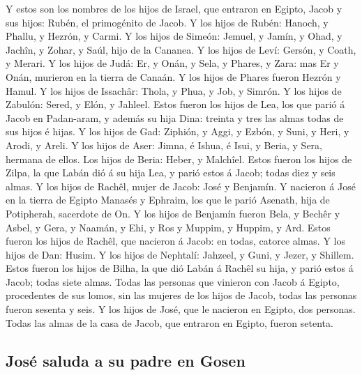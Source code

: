  Y estos son los nombres de los hijos de Israel, que
entraron en Egipto, Jacob y sus hijos: Rubén, el primogénito de Jacob.
 Y los hijos de Rubén: Hanoch, y Phallu, y Hezrón, y
Carmi.  Y los hijos de Simeón: Jemuel, y Jamín, y Ohad, y
Jachîn, y Zohar, y Saúl, hijo de la Cananea.  Y los hijos
de Leví: Gersón, y Coath, y Merari.  Y los hijos de Judá:
Er, y Onán, y Sela, y Phares, y Zara: mas Er y Onán, murieron en la
tierra de Canaán. Y los hijos de Phares fueron Hezrón y Hamul.
 Y los hijos de Issachâr: Thola, y Phua, y Job, y Simrón.
 Y los hijos de Zabulón: Sered, y Elón, y Jahleel.
 Estos fueron los hijos de Lea, los que parió á Jacob en
Padan-aram, y además su hija Dina: treinta y tres las almas todas de sus
hijos é hijas.  Y los hijos de Gad: Ziphión, y Aggi, y
Ezbón, y Suni, y Heri, y Arodi, y Areli.  Y los hijos de
Aser: Jimna, é Ishua, é Isui, y Beria, y Sera, hermana de ellos. Los
hijos de Beria: Heber, y Malchîel.  Estos fueron los
hijos de Zilpa, la que Labán dió á su hija Lea, y parió estos á Jacob;
todas diez y seis almas.  Y los hijos de Rachêl, mujer de
Jacob: José y Benjamín.  Y nacieron á José en la tierra
de Egipto Manasés y Ephraim, los que le parió Asenath, hija de
Potipherah, sacerdote de On.  Y los hijos de Benjamín
fueron Bela, y Bechêr y Asbel, y Gera, y Naamán, y Ehi, y Ros y Muppim,
y Huppim, y Ard.  Estos fueron los hijos de Rachêl, que
nacieron á Jacob: en todas, catorce almas.  Y los hijos
de Dan: Husim.  Y los hijos de Nephtalí: Jahzeel, y Guni,
y Jezer, y Shillem.  Estos fueron los hijos de Bilha, la
que dió Labán á Rachêl su hija, y parió estos á Jacob; todas siete
almas.  Todas las personas que vinieron con Jacob á
Egipto, procedentes de sus lomos, sin las mujeres de los hijos de Jacob,
todas las personas fueron sesenta y seis.  Y los hijos de
José, que le nacieron en Egipto, dos personas. Todas las almas de la
casa de Jacob, que entraron en Egipto, fueron setenta.

\hypertarget{josuxe9-saluda-a-su-padre-en-gosen}{%
\subsection{José saluda a su padre en
Gosen}\label{josuxe9-saluda-a-su-padre-en-gosen}}

